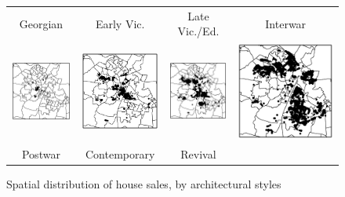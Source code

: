 \documentclass[]{article}
\begin{document}
\begin{figure}[ht]
\centering
\caption{ Spatial distribution of house sales, by architectural styles}
\label{fig:spatial}
\begin{tabular}{cccc}
\toprule
Georgian & Early Vic. & Late Vic./Ed. & Interwar \\
 \includegraphics[width=1.3in]{figures/a georgian.pdf} & \includegraphics[width=1.3in]{figures/b victorian.pdf} & \includegraphics[width=1.3in]{figures/c edwardian late victorian.pdf} & \includegraphics[width=1.3 in]{figures/d interwar.pdf} \\
 Postwar & Contemporary & Revival \\

\end{tabular}
\end{figure}
\end{document}
